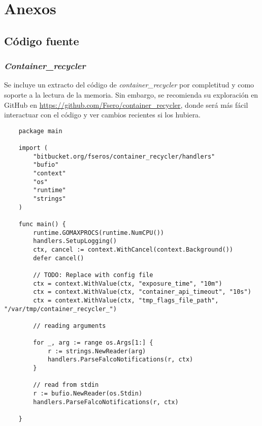 \chapter{Anexos}

\section{Código fuente}

\subsection{\emph{Container\_recycler}}
\label{subsec:containe-recycler-src-code}

Se incluye un extracto del código de \emph{container\_recycler} por completitud y como soporte a la lectura de la memoria. Sin
embargo, se recomienda su exploración en GitHub en \href{https://github.com/Fsero/container\_recycler}{https://github.com/Fsero/container\_recycler}, donde será más fácil interactuar con el código y ver cambios recientes si los 
hubiera.

\begin{verbatim}
    package main
    
    import (
        "bitbucket.org/fseros/container_recycler/handlers"
        "bufio"
        "context"
        "os"
        "runtime"
        "strings"
    )
    
    func main() {
        runtime.GOMAXPROCS(runtime.NumCPU())
        handlers.SetupLogging()
        ctx, cancel := context.WithCancel(context.Background())
        defer cancel()
    
        // TODO: Replace with config file
        ctx = context.WithValue(ctx, "exposure_time", "10m")
        ctx = context.WithValue(ctx, "container_api_timeout", "10s")
        ctx = context.WithValue(ctx, "tmp_flags_file_path", "/var/tmp/container_recycler_")
    
        // reading arguments
    
        for _, arg := range os.Args[1:] {
            r := strings.NewReader(arg)
            handlers.ParseFalcoNotifications(r, ctx)
        }
    
        // read from stdin
        r := bufio.NewReader(os.Stdin)
        handlers.ParseFalcoNotifications(r, ctx)
    
    }
    
\end{verbatim}

